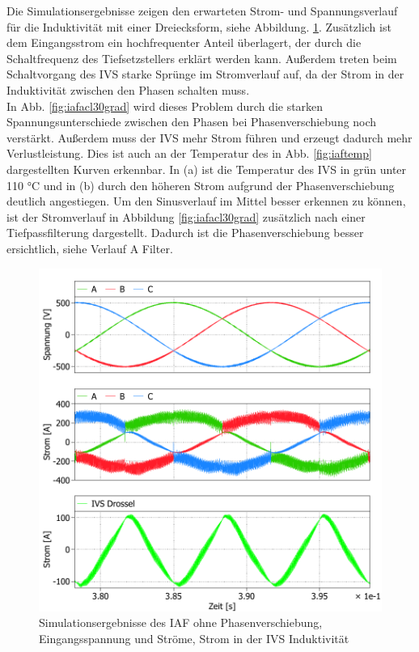 Die Simulationsergebnisse zeigen den erwarteten Strom- und Spannungsverlauf für die Induktivität mit einer Dreiecksform, siehe Abbildung. \ref{fig:iafacl}. Zusätzlich ist dem Eingangsstrom ein hochfrequenter Anteil überlagert, der durch die Schaltfrequenz des Tiefsetzstellers erklärt werden kann. Außerdem treten beim Schaltvorgang des \gls{IVS} starke Sprünge im Stromverlauf auf, da der Strom in der Induktivität zwischen den Phasen schalten muss.\\
In Abb. \ref{fig:iafacl30grad} wird dieses Problem durch die starken Spannungsunterschiede zwischen den Phasen bei Phasenverschiebung noch verstärkt. Außerdem muss der \gls{IVS} mehr Strom führen und erzeugt dadurch mehr Verlustleistung. Dies ist auch an der Temperatur des in Abb. \ref{fig:iaftemp} dargestellten Kurven erkennbar. In (a) ist die Temperatur des IVS in grün unter 110 °C und in (b) durch den höheren Strom aufgrund der Phasenverschiebung deutlich angestiegen. Um den Sinusverlauf im Mittel besser erkennen zu können, ist der Stromverlauf in Abbildung \ref{fig:iafacl30grad} zusätzlich nach einer Tiefpassfilterung dargestellt. Dadurch ist die Phasenverschiebung besser ersichtlich, siehe Verlauf A Filter. 
\begin{figure}
	\centering
	\includegraphics[width=1\linewidth]{content/Grafiken/IAF_AC+L}
	\caption{Simulationsergebnisse des IAF ohne Phasenverschiebung, Eingangsspannung und Ströme, Strom in der IVS Induktivität }
	\label{fig:iafacl}
\end{figure}

